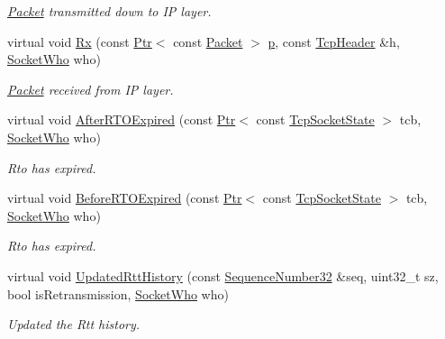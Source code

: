 \begin{DoxyCompactItemize}
\begin{DoxyCompactList}\small\item\em \hyperlink{classns3_1_1Packet}{Packet} transmitted down to IP layer. \end{DoxyCompactList}\item 
virtual void \hyperlink{classns3_1_1TcpGeneralTest_ab4744fb3cbeb09405e2debc943c01c3a}{Rx} (const \hyperlink{classns3_1_1Ptr}{Ptr}$<$ const \hyperlink{classns3_1_1Packet}{Packet} $>$ \hyperlink{lte__link__budget__x2__handover__measures_8m_ac9de518908a968428863f829398a4e62}{p}, const \hyperlink{classns3_1_1TcpHeader}{Tcp\+Header} \&h, \hyperlink{classns3_1_1TcpGeneralTest_a29338e6b7137cad650c2ff835713f6ee}{Socket\+Who} who)
\begin{DoxyCompactList}\small\item\em \hyperlink{classns3_1_1Packet}{Packet} received from IP layer. \end{DoxyCompactList}\item 
virtual void \hyperlink{classns3_1_1TcpGeneralTest_acbfa9bd62fbc144349b1dddc6b21c855}{After\+R\+T\+O\+Expired} (const \hyperlink{classns3_1_1Ptr}{Ptr}$<$ const \hyperlink{classns3_1_1TcpSocketState}{Tcp\+Socket\+State} $>$ tcb, \hyperlink{classns3_1_1TcpGeneralTest_a29338e6b7137cad650c2ff835713f6ee}{Socket\+Who} who)
\begin{DoxyCompactList}\small\item\em Rto has expired. \end{DoxyCompactList}\item 
virtual void \hyperlink{classns3_1_1TcpGeneralTest_a55d17115937d7461d2ec28cea2513e0d}{Before\+R\+T\+O\+Expired} (const \hyperlink{classns3_1_1Ptr}{Ptr}$<$ const \hyperlink{classns3_1_1TcpSocketState}{Tcp\+Socket\+State} $>$ tcb, \hyperlink{classns3_1_1TcpGeneralTest_a29338e6b7137cad650c2ff835713f6ee}{Socket\+Who} who)
\begin{DoxyCompactList}\small\item\em Rto has expired. \end{DoxyCompactList}\item 
virtual void \hyperlink{classns3_1_1TcpGeneralTest_a76d3d48cdce7914920506a695bead8dd}{Updated\+Rtt\+History} (const \hyperlink{group__network_gacb2070e4e98d2d5135c9bede58f07a03}{Sequence\+Number32} \&seq, uint32\+\_\+t sz, bool is\+Retransmission, \hyperlink{classns3_1_1TcpGeneralTest_a29338e6b7137cad650c2ff835713f6ee}{Socket\+Who} who)
\begin{DoxyCompactList}\small\item\em Updated the Rtt history. \end{DoxyCompactList}\item 

\end{DoxyCompactItemize}
